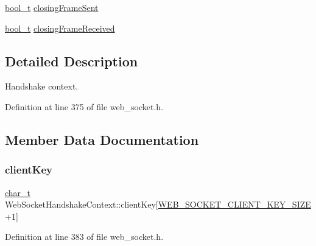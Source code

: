 \begin{DoxyCompactItemize}
\item 
\hyperlink{compiler__port_8h_a812d16e5494522586b3784e55d479912}{bool\+\_\+t} \hyperlink{structWebSocketHandshakeContext_aedbd3ec32c5ee2a37f20ea61b400b878}{closing\+Frame\+Sent}
\item 
\hyperlink{compiler__port_8h_a812d16e5494522586b3784e55d479912}{bool\+\_\+t} \hyperlink{structWebSocketHandshakeContext_a9958c4c030fb243ed8c7b4b13f1932db}{closing\+Frame\+Received}
\end{DoxyCompactItemize}


\subsection{Detailed Description}
Handshake context. 

Definition at line 375 of file web\+\_\+socket.\+h.



\subsection{Member Data Documentation}
\mbox{\label{structWebSocketHandshakeContext_af28fef00979612ccfed3ab93d5da1b38}} 
\subsubsection{\texorpdfstring{client\+Key}{clientKey}}
{\footnotesize\ttfamily \hyperlink{compiler__port_8h_a40bb5262bf908c328fbcfbe5d29d0201}{char\+\_\+t} Web\+Socket\+Handshake\+Context\+::client\+Key\mbox{[}\hyperlink{web__socket_8h_aec52a37b246082418c0b6dbf0235e99d}{W\+E\+B\+\_\+\+S\+O\+C\+K\+E\+T\+\_\+\+C\+L\+I\+E\+N\+T\+\_\+\+K\+E\+Y\+\_\+\+S\+I\+ZE}+1\mbox{]}}



Definition at line 383 of file web\+\_\+socket.\+h.

\mbox{\label{structWebSocketHandshakeContext_a9958c4c030fb243ed8c7b4b13f1932db}} 
